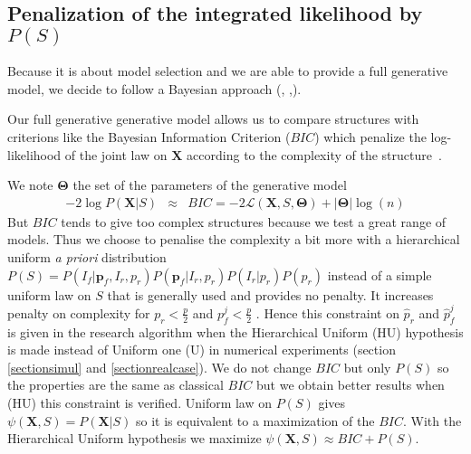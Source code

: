 \documentclass[11pt,a4paper]{article}
\begin{document}
	\subsection{Penalization of the integrated likelihood by $P(S)$} \label{compstruct}

Because it is about model selection and we are able to provide a full generative model, we decide to follow a Bayesian approach (\cite{raftery1995bayesian}, \cite{andrieu1999joint},\cite{chipman2001practical}).  
	
  Our full generative generative model allows us to compare structures with criterions like the Bayesian Information Criterion ($BIC$) which penalize the log-likelihood of the joint law on $\boldsymbol{X}$ according to the complexity of the structure~\cite{BIChuard}. 

	We note $\boldsymbol{\Theta}$ the set of the parameters of the generative model
	\begin{eqnarray}
		-2\log P(\boldsymbol{X}|S)&\approx & BIC=-2\mathcal{L}(\boldsymbol{X},S,\boldsymbol{\Theta})+|\boldsymbol{\Theta}|\log(n)  
	\end{eqnarray}
	But $BIC$ tends to give too complex structures because we test a great range of models. 
	Thus we choose to penalise the complexity a bit more with a hierarchical uniform {\it a priori} distribution $P(S)=P(I_f | \boldsymbol{p}_f,I_r,p_r)P(\boldsymbol{p}_f|I_r,p_r)P(I_r|p_r)P(p_r)$  instead of a simple uniform law on $S$ that is generally used and provides no penalty.
	It increases penalty on complexity for $p_r<\frac{p}{2}$ and $p_f^j<\frac{p}{2}$ . Hence %
	this constraint on $\hat{p}_r$ and $\hat{p}_f^j$ is given in the research algorithm when the Hierarchical Uniform (HU) hypothesis is made instead of Uniform one (U) in numerical experiments (section \ref{sectionsimul} and \ref{sectionrealcase}).
		We do not change $BIC$ but only $P(S)$ so the properties are the same as classical $BIC$ but we obtain better results when (HU) this constraint is verified. Uniform law on $P(S)$ gives $\psi(\boldsymbol{X},S)=P(\boldsymbol{X}|S)$ so it is equivalent to a maximization of the $BIC$. With the Hierarchical Uniform hypothesis we maximize $\psi(\boldsymbol{X},S)\approx BIC + P(S)$.

%	
\end{document}
